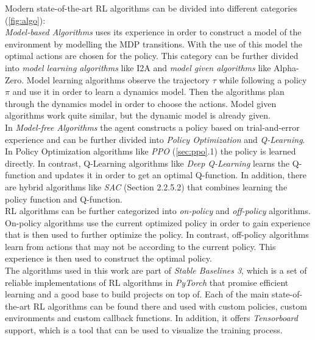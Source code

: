 Modern state-of-the-art RL algorithms can be divided into different categories (\cref{fig:algo}):\\
\emph{Model-based Algorithms} uses its experience in order to construct a model of the environment by modelling the MDP transitions. 
With the use of this model the optimal actions are chosen for the policy. This category can be further divided into \emph{model learning algorithms} 
like I2A and \emph{model given algorithms} like Alpha-Zero. 
Model learning algorithms observe the trajectory $\tau$ while following a policy $\pi$ and use it in order to learn a dynamics model. 
Then the algorithms plan through the dynamics model in order to choose the actions.
Model given algorithms work quite similar, but the dynamic model is already given.\\
In \emph{Model-free Algorithms} the agent constructs a policy based on trial-and-error experience and can be further divided into 
\emph{Policy Optimization} and \emph{Q-Learning}.
In Policy Optimization algorithms like \emph{PPO} (\cref{sec:ppo}.1) the policy is learned directly. 
In contrast, Q-Learning algorithms like \emph{Deep Q-Learning} learns the Q-function and updates it in order to get an optimal Q-function. 
In addition, there are hybrid algorithms like \emph{SAC} (Section 2.2.5.2) that combines learning the policy function and Q-function.\\
RL algorithms can be further categorized into \emph{on-policy} and \emph{off-policy} algorithms. 
On-policy algorithms use the current optimized policy in order to gain experience that is then used to further optimize the policy. 
In contrast, off-policy algorithms learn from actions that may not be according to the current policy. 
This experience is then used to construct the optimal policy.\\
The algorithms used in this work are part of \emph{Stable Baselines 3}\cite{stable-baselines3}, 
which is a set of reliable implementations of RL algorithms in \emph{PyTorch} that promise efficient learning and a good base to build projects on top of. 
Each of the main state-of-the-art RL algorithms can be found there and used with custom policies, custom environments and custom callback functions. 
In addition, it offers \emph{Tensorboard} support, which is a tool that can be used to visualize the training process.

\newpage
